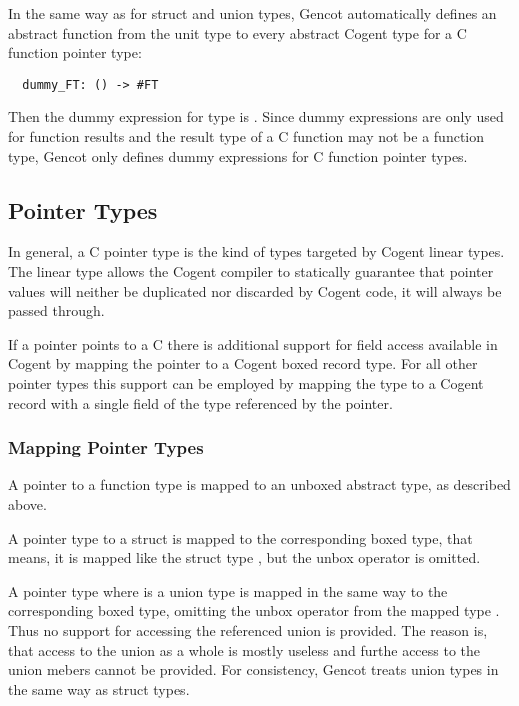 In the same way as for struct and union types, Gencot automatically defines an 
abstract function from the unit type to every abstract Cogent type  for a C function pointer type:
\begin{verbatim}
  dummy_FT: () -> #FT
\end{verbatim}

Then the dummy expression for type  is . Since dummy expressions are only used 
for function results and the result type of a C function may not be a function
type, Gencot only defines dummy expressions for C function pointer types.

\subsection{Pointer Types}
\label{design-types-pointer}

In general, a C pointer type  is the kind of types targeted by Cogent linear types. The linear type 
allows the Cogent compiler to statically guarantee that pointer values will neither be duplicated nor 
discarded by Cogent code, it will always be passed through. 

If a pointer points to a C  there is additional support for field access available in Cogent by 
mapping the pointer to a Cogent boxed record type. For all other pointer types this support can be employed by
mapping the type to a Cogent record with a single field of the type referenced by the pointer.

\subsubsection{Mapping Pointer Types}

A pointer to a function type is mapped to an unboxed abstract type, as described above.

A pointer type  to a struct is mapped to the corresponding boxed type, 
that means, it is mapped like the struct type , but the unbox operator is omitted.

A pointer type  where  is a union type is mapped in the same way to the corresponding
boxed type, omitting the unbox operator from the mapped type . Thus no support for accessing
the referenced union is provided. The reason is, that access to the union as a whole is mostly useless
and furthe access to the union mebers cannot be provided. For consistency, Gencot treats union types
in the same way as struct types.

